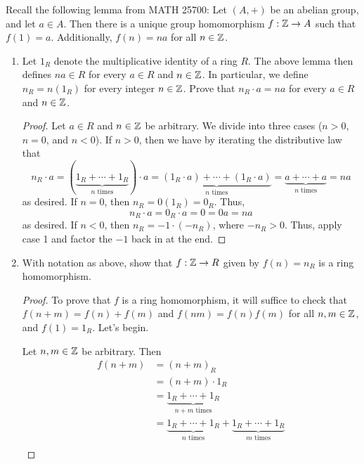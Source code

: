 \documentclass[../psets.tex]{subfiles}
\begin{document}
Recall the following lemma from MATH 25700: Let $(A,+)$ be an abelian group, and let $a\in A$. Then there is a unique group homomorphism $f:\mathbb{Z}\to A$ such that $f(1)=a$. Additionally, $f(n)=na$ for all $n\in\mathbb{Z}$.
\begin{enumerate}[resume]
    \item Let $1_R$ denote the multiplicative identity of a ring $R$. The above lemma then defines $na\in R$ for every $a\in R$ and $n\in\mathbb{Z}$. In particular, we define $n_R=n(1_R)$ for every integer $n\in\mathbb{Z}$. Prove that $n_R\cdot a=na$ for every $a\in R$ and $n\in\mathbb{Z}$.
    \begin{proof}


        Let $a\in R$ and $n\in\mathbb{Z}$ be arbitrary. We divide into three cases ($n>0$, $n=0$, and $n<0$). If $n>0$, then we have by iterating the distributive law that
        \begin{equation*}
            n_R\cdot a = (\underbrace{1_R+\cdots+1_R}_{n\text{ times}})\cdot a
            = \underbrace{(1_R\cdot a)+\cdots+(1_R\cdot a)}_{n\text{ times}}
            = \underbrace{a+\cdots+a}_{n\text{ times}}
            = na
        \end{equation*}
        as desired. If $n=0$, then $n_R=0(1_R)=0_R$. Thus,
        \begin{equation*}
            n_R\cdot a = 0_R\cdot a = 0 = 0a = na
        \end{equation*}
        as desired. If $n<0$, then $n_R=-1\cdot(-n_R)$, where $-n_R>0$. Thus, apply case 1 and factor the $-1$ back in at the end.
    \end{proof}
    \item With notation as above, show that $f:\mathbb{Z}\to R$ given by $f(n)=n_R$ is a ring homomorphism.
    \begin{proof}
        To prove that $f$ is a ring homomorphism, it will suffice to check that $f(n+m)=f(n)+f(m)$ and $f(nm)=f(n)f(m)$ for all $n,m\in\mathbb{Z}$, and $f(1)=1_R$. Let's begin.\par
        Let $n,m\in\mathbb{Z}$ be arbitrary. Then
        \begin{align*}
            f(n+m) &= (n+m)_R\\
            &= (n+m)\cdot 1_R\\
            &= \underbrace{1_R+\cdots+1_R}_{n+m\text{ times}}\\
            &= \underbrace{1_R+\cdots+1_R}_{n\text{ times}}+\underbrace{1_R+\cdots+1_R}_{m\text{ times}}\\

\end{align*}
\end{proof}
\end{enumerate}
\end{document}
